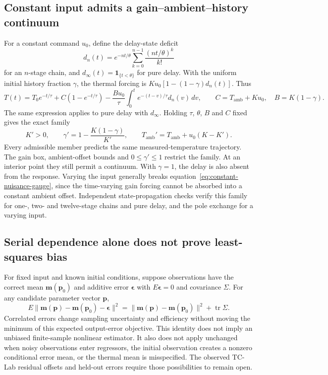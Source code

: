 \documentclass[11pt]{article}
\newcommand{\Tamb}{T_{\mathrm{amb}}}
\begin{document}
\subsection{Constant input admits a gain--ambient--history continuum}
For a constant command $u_0$, define the delay-state deficit
\[
d_n(t)=e^{-nt/\theta}\sum_{k=0}^{n-1}\frac{(nt/\theta)^k}{k!}
\]
for an $n$-stage chain, and $d_\infty(t)=\mathbf 1_{\{t<\theta\}}$
for pure delay. With the uniform initial history fraction $\gamma$, the
thermal forcing is $K u_0[1-(1-\gamma)d_n(t)]$. Thus
\[
 T(t)=T_0 e^{-t/\tau}+C(1-e^{-t/\tau})
 -\frac{B u_0}{\tau}\int_0^t e^{-(t-v)/\tau}d_n(v)\,dv,
 \qquad C=\Tamb+K u_0,\quad B=K(1-\gamma).
\]
The same expression applies to pure delay with $d_\infty$. Holding $\tau$,
$\theta$, $B$ and $C$ fixed gives the exact family
\begin{equation}
 K'>0,\qquad
 \gamma'=1-\frac{K(1-\gamma)}{K'},\qquad
 \Tamb'=\Tamb+u_0(K-K').
 \label{eq:constant-nuisance-gauge}
\end{equation}
Every admissible member predicts the same measured-temperature trajectory.
The gain box, ambient-offset bounds and $0\leq\gamma'\leq1$ restrict the
family. At an interior point they still permit a continuum. With
$\gamma=1$, the delay is also absent from the response. Varying the input
generally breaks equation~\eqref{eq:constant-nuisance-gauge}, since the
time-varying gain forcing cannot be absorbed into a constant ambient offset.
Independent state-propagation checks verify this family for one-, two- and
twelve-stage chains and pure delay, and the pole exchange for a varying input.

\subsection{Serial dependence alone does not prove least-squares bias}
For fixed input and known initial conditions, suppose observations have the
correct mean $\bm m(\bm p_0)$ and additive error $\bm\epsilon$ with
$E\bm\epsilon=0$ and covariance $\Sigma$. For any candidate parameter vector
$\bm p$,
\[
 E\|\bm m(\bm p)-\bm m(\bm p_0)-\bm\epsilon\|^2
 =\|\bm m(\bm p)-\bm m(\bm p_0)\|^2+\operatorname{tr}\Sigma.
\]
Correlated errors change sampling uncertainty and efficiency without moving the
minimum of this expected output-error objective. This identity does not imply
an unbiased finite-sample nonlinear estimator. It also does not apply unchanged
when noisy observations enter regressors, the initial observation creates a
nonzero conditional error mean, or the thermal mean is misspecified. The
observed TC-Lab residual offsets and held-out errors require those possibilities
to remain open.
\end{document}
